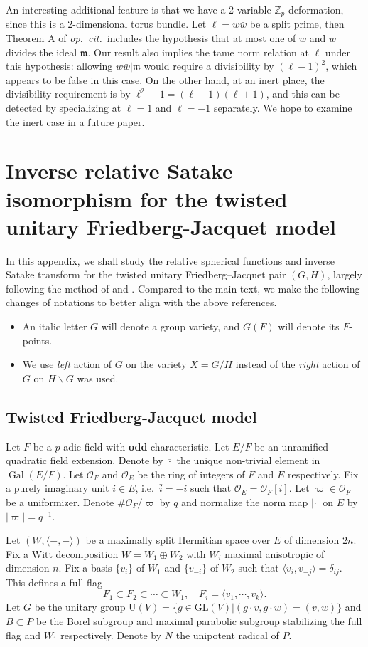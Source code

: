 \documentclass{amsart}
\theoremstyle{definition}
\theoremstyle{remark}
\newcommand{\1}{\mathbf{1}}
\newcommand{\GL}{\mathrm{GL}}
\newcommand{\m}{\mathfrak{m}}
\newcommand{\U}{\mathrm{U}}
\newcommand{\Z}{\mathbb{Z}}
\DeclareMathOperator{\Gal}{Gal}
\theoremstyle{definition}
\newcommand{\CO}{{\mathcal {O}}}
\begin{document}
An interesting additional feature is that we have a 2-variable $\Z_p$-deformation, since this is a 2-dimensional torus bundle. Let $\ell=w\bar{w}$ be a split prime, then Theorem A of \emph{op.~cit.~}includes the hypothesis that at most one of $w$ and $\bar{w}$ divides the ideal $\m$. Our result also implies the tame norm relation at $\ell$ under this hypothesis: allowing $w\bar{w}|\m$ would require a divisibility by $(\ell-1)^2$, which appears to be false in this case. On the other hand, at an inert place, the divisibility requirement is by $\ell^2-1=(\ell-1)(\ell+1)$, and this can be detected by specializing at $\ell=1$ and $\ell=-1$ separately. We hope to examine the inert case in a future paper.

\appendix
    
\section{Inverse relative Satake isomorphism for the twisted unitary Friedberg-Jacquet model}
In this appendix, we shall  study the relative spherical functions and inverse Satake transform for the twisted unitary Friedberg--Jacquet pair $(G,H)$, largely following the method of \cite{Hir10} and \cite{Off04}. Compared to the main text, we make the following changes of notations to better align with the above references.
\begin{itemize}
    \item An italic letter $G$ will denote a group variety, and $G(F)$ will denote its $F$-points.
    \item We use \emph{left} action of $G$ on the variety $X=G/H$ instead of the \emph{right} action of $G$ on $H\backslash G$ was used.
\end{itemize}
\subsection{Twisted Friedberg-Jacquet model}
Let $F$ be a $p$-adic field with {\bf odd} characteristic. Let $E/F$ be  an unramified quadratic field extension. Denote by $\overline{\cdot}$ the unique non-trivial element in $\Gal(E/F)$. Let $\CO_F$ and $\CO_E$ be the ring of integers of $F$ and $E$ respectively. Fix a purely imaginary unit $i\in E$, i.e.~$\bar{i}=-i$ such that $\CO_E=\CO_F[i]$.  Let $\varpi\in \CO_F$ be a uniformizer. Denote $\# \CO_F/\varpi$ by $q$ and normalize the norm map $|\cdot|$ on $E$ by $|\varpi|=q^{-1}$. 

Let $\left(W,\langle-,-\rangle\right)$ be a maximally split Hermitian space over $E$ of dimension $2n$. Fix a Witt decomposition $W=W_1\oplus W_2$ with $W_i$  maximal anisotropic of dimension $n$. Fix a basis $\{v_i\}$ of $W_1$ and $\{v_{-i}\}$ of $W_2$ such that $\langle v_i, v_{-j}\rangle=\delta_{ij}$. This defines a full flag  \[F_1\subset F_2\subset \cdots \subset W_1,\quad F_i=\langle v_1,\cdots, v_k\rangle.\]
Let $G$ be  the unitary group $\U(V)=\{g\in \GL(V)| (g\cdot v, g\cdot w)=(v,w)\}$ and $B\subset P$ be the  Borel subgroup and maximal parabolic subgroup stabilizing the full flag and $W_1$ respectively. Denote by $N$ the unipotent radical of $P$.
\end{document}

